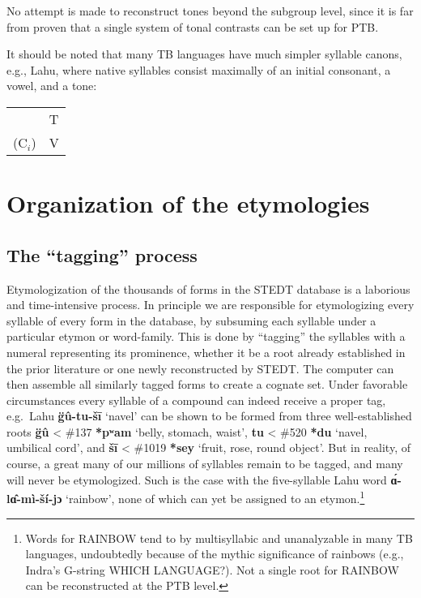 No attempt is made to reconstruct tones beyond the subgroup level, since it is far from proven that a single system of tonal contrasts can be set up for PTB.

It should be noted that many TB languages have much simpler syllable canons, e.g., Lahu, where native syllables consist maximally of an initial consonant, a vowel, and a tone:

\begin{table}[h!]
\centering
\begin{tabular}{ll}
	&T\\
($\textrm{C}_i$)	&V\\
\end{tabular}
\end{table}


\section{Organization of the etymologies}

\subsection{The “tagging” process}

Etymologization of the thousands of forms in the STEDT database is a laborious and time-intensive process. In principle we are responsible for etymologizing every syllable of every form in the database, by subsuming each syllable under a particular etymon or word-family. This is done by “tagging” the syllables with a numeral representing its prominence, whether it be a root already established in the prior literature or one newly reconstructed by STEDT. The computer can then assemble all similarly tagged forms to create a cognate set. Under favorable circumstances every syllable of a compound can indeed receive a proper tag, e.g.\ Lahu \textbf{g̈û-tu-šī} ‘navel’ can be shown to be formed from three well-established roots \textbf{g̈û} < \#137 \textbf{*pʷam} ‘belly, stomach, waist’, \textbf{tu} < \#520 \textbf{*du} ‘navel, umbilical cord’, and \textbf{šī} < \#1019 \textbf{*sey} ‘fruit, rose, round object’. But in reality, of course, a great many of our millions of syllables remain to be tagged, and many will never be etymologized. Such is the case with the five-syllable Lahu word \textbf{ɑ́-lɑ̂-mì-ší-jɔ} ‘rainbow’, none of which can yet be assigned to an etymon.\footnote{Words for RAINBOW tend to by multisyllabic and unanalyzable in many TB languages, undoubtedly because of the mythic significance of rainbows (e.g., Indra’s G-string WHICH LANGUAGE?). Not a single root for RAINBOW can be reconstructed at the PTB level.}

